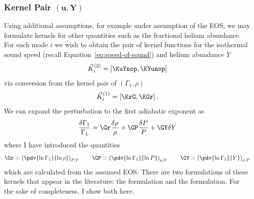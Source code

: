 \subsubsection*{Kernel Pair $\mathbf{(u,Y)}$}
\noindent
Using additional assumptions, for example under assumption of the EOS, we may formulate kernels for other quantities such as the fractional helium abundance. 
For each mode $i$ we wish to obtain the pair of kernel functions for the isothermal sound speed (recall Equation~\ref{eq:speed-of-sound}) and helium abundance $Y$
\begin{equation}
    \vec K^{(2)}_i = \left[ \KuYnop, \KYunop \right]
\end{equation}
via conversion from the kernel pair of ${(\Gamma_1, \rho)}$
\begin{equation}
    \vec K^{(1)}_i = \left[ \KrG, \KGr \right].
\end{equation}
We can expand the perturbation to the first adiabatic exponent as
\begin{equation}
    \frac{\delta \Gamma_1}{\Gamma_1}
    =
    \Gr \frac{\delta\rho}{\rho}
    +
    \GP \frac{\delta P}{P}
    +
    \GY \delta Y
\end{equation}
where I have introduced the quantities
\begin{equation}
    \Gr \equiv \left( \pdv{\ln \Gamma_1}{\ln \rho} \right)_{P, Y} \qquad 
    \GP \equiv \left( \pdv{\ln \Gamma_1}{\ln P} \right)_{\rho, Y} \qquad
    \GY \equiv \left( \pdv{\ln \Gamma_1}{Y} \right)_{\rho, P}
\end{equation} 
which are calculated from the assumed EOS. 
There are two formulations of these kernels that appear in the literature: the \citet{ThompsonJCD2002} formulation and the \citet{Kosovichev1999} formulation. 
For the sake of completeness, I show both here. 

